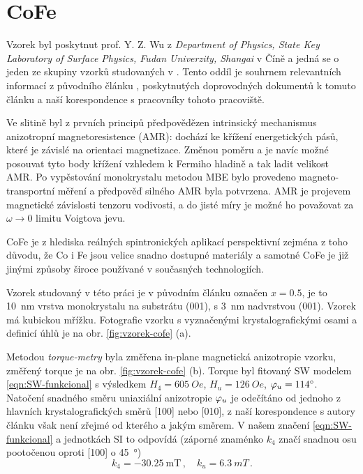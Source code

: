 \section{CoFe}
\label{chap:vzorek-cofe}

Vzorek byl poskytnut prof. Y. Z. Wu z \emph{Department of Physics, State Key Laboratory of Surface Physics, Fudan Univerzity, Shangai} v Číně a jedná se o jeden ze skupiny vzorků studovaných v \cite{zengIntrinsicMechanismAnisotropic2020}.
Tento oddíl je souhrnem relevantních informací z původního článku \cite{zengIntrinsicMechanismAnisotropic2020}, poskytnutých doprovodných dokumentů k tomuto článku a naší korespondence s pracovníky tohoto pracoviště.

Ve slitině  byl z prvních principů předpovědězen intrinsický mechanismus anizotropní magnetoresistence (AMR): dochází ke křížení energetických pásů, které je závislé na orientaci magnetizace.
Změnou poměru  a  je navíc možné posouvat tyto body křížení vzhledem k Fermiho hladině a tak ladit velikost AMR.
Po vypěstování monokrystalu metodou MBE bylo provedeno magneto-transportní měření a předpověď silného AMR byla potvrzena\cite{zengIntrinsicMechanismAnisotropic2020}.
AMR je projevem magnetické závislosti tenzoru vodivosti, a do jisté míry je možné ho považovat za $\omega\to 0$ limitu Voigtova jevu\cite{tesarovaSystematicStudyMagnetic2014}.

CoFe je z hlediska reálných spintronických aplikací perspektivní zejména z toho důvodu, že Co i Fe jsou velice snadno dostupné materiály a samotné CoFe je již jinými způsoby široce používané v současných technologiích.

Vzorek studovaný v této práci je v původním článku označen $x=0.5$, je to \SI{10}{\nano\meter} vrstva monokrystalu  na substrátu (001), s \SI{3}{\nano\meter} nadvrstvou (001).
Vzorek má kubickou mřížku.
Fotografie vzorku s vyznačenými krystalografickými osami a definicí úhlů je na obr. \ref{fig:vzorek-cofe} (a).

Metodou \emph{torque-metry} byla změřena in-plane magnetická anizotropie vzorku, změřený torque je na obr. \ref{fig:vzorek-cofe} (b).
Torque byl fitovaný SW modelem \eqref{eqn:SW-funkcional} s výsledkem $H_4=\SI{605}{Oe}$, $H_u=\SI{126}{Oe}$, $\varphi_u=\SI{114}{\degree}$.
Natočení snadného směru uniaxiální anizotropie $\varphi_u$ je odečítáno od jednoho z hlavních krystalografických směrů [100] nebo [010], z naší korespondence s autory článku \cite{zengIntrinsicMechanismAnisotropic2020} však není zřejmé od kterého a jakým směrem.
V našem značení \eqref{eqn:SW-funkcional} a jednotkách SI to odpovídá (záporné znaménko $k_4$ značí snadnou osu pootočenou oproti [100] o \SI{45}{\degree})
\begin{equation}
\label{eqn:cofe-anizotropni-konstanty-cina}
    k_4 = -\SI{30.25}{\milli\tesla} \,,\quad k_u = \SI{6.3}{mT} \,.
\end{equation}


